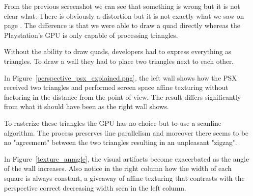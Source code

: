 From the previous screenshot we can see that something is wrong but it is not clear what. There is obviously a distortion but it is not exactly what we saw on page \pageref{affine_texture_examples}. The difference is that we were able to draw a quad directly whereas the Playstation's GPU is only capable of processing triangles.\\
\par
 Without the ability to  draw quads, developers had to express everything as triangles. To draw a wall they had to place two triangles next to each other.\\
\par
{}
\par
In Figure~\ref{perspective_psx_explained.png}, the left wall shows how the PSX received two triangles and performed screen space affine texturing without factoring in the distance from the point of view. The result differs significantly from what it should have been as the right wall shows.\\
\par
 To rasterize these triangles the GPU has no choice but to use a scanline algorithm. The process preserves line parallelism and moreover there seems to be no "agreement" between the two triangles resulting in an unpleasant "zigzag".\\
\par
In Figure~\ref{texture_anmgle}, the visual artifacts become exacerbated as the angle of the wall increases. Also notice in the right column how the width of each square is always constant, a giveaway of affine texturing that contrasts with the perspective correct decreasing width seen in the left column.\\ 
\pagebreak




